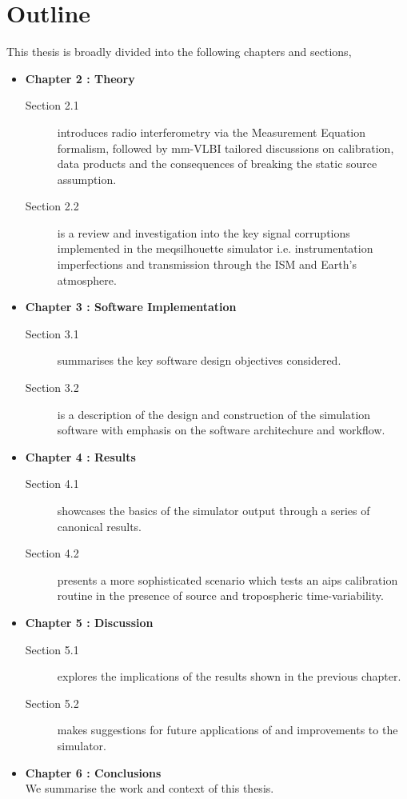 \section{Outline}
This thesis is broadly divided into the following chapters and sections,
\begin{itemize}
 \item {\bf Chapter 2 : Theory} 
 \begin{description}
  \item [Section 2.1] introduces radio interferometry via the Measurement Equation formalism, followed by mm-VLBI tailored discussions on calibration, data products and the consequences of breaking the static source assumption.
  \item [Section 2.2] is a review and investigation into the key signal corruptions implemented in the {\sc meqsilhouette} simulator i.e. instrumentation imperfections and transmission through the ISM and Earth's atmosphere.
 \end{description}

 \item {\bf Chapter 3 : Software Implementation}
 \begin{description}
  \item [Section 3.1] summarises the key software design objectives considered.
  \item [Section 3.2] is a description of the design and construction of the simulation software with emphasis on the software architechure and workflow.
 \end{description}

 
 \item {\bf Chapter 4 : Results}
 \begin{description}
  \item  [Section 4.1] showcases the basics of the simulator output through a series of canonical results.
  \item [Section 4.2] presents a more sophisticated scenario which tests an {\sc aips} calibration routine in the presence of source and tropospheric time-variability.
 \end{description}
 
  \item {\bf Chapter 5 : Discussion}
  \begin{description}
   \item [Section 5.1] explores the implications of the results shown in the previous chapter.
   \item [Section 5.2] makes suggestions for future applications of and improvements to the simulator.
  \end{description}

  
 
  \item {\bf Chapter 6 : Conclusions }\\
  We summarise the work and context of this thesis. 
\end{itemize}
















